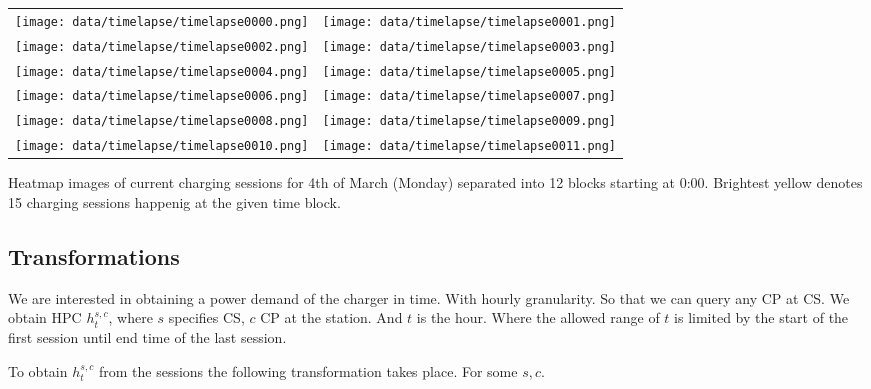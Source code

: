 \begin{marginfigure}
    \begin{tabular}{cc}
        \texttt{[image: data/timelapse/timelapse0000.png]} &
        \texttt{[image: data/timelapse/timelapse0001.png]}   \\
        \texttt{[image: data/timelapse/timelapse0002.png]} &
        \texttt{[image: data/timelapse/timelapse0003.png]}   \\
        \texttt{[image: data/timelapse/timelapse0004.png]} &
        \texttt{[image: data/timelapse/timelapse0005.png]}   \\
        \texttt{[image: data/timelapse/timelapse0006.png]} &
        \texttt{[image: data/timelapse/timelapse0007.png]}   \\
        \texttt{[image: data/timelapse/timelapse0008.png]} &
        \texttt{[image: data/timelapse/timelapse0009.png]}   \\
        \texttt{[image: data/timelapse/timelapse0010.png]} &
        \texttt{[image: data/timelapse/timelapse0011.png]}   \\
    \end{tabular}
    \caption{Heatmap images of current charging sessions for 4th of March (Monday) separated into 12 blocks starting at 0:00. Brightest yellow denotes 15 charging sessions happenig at the given time block.}
    \label{fig:timelapse-grid-full}
\end{marginfigure}




\subsection{Transformations}

We are interested in obtaining a power demand of the charger in time. With hourly granularity. So that we can query any \acrlong{CP} at \acrlong{CS}.
We obtain \acrlong{HPC} $h^{s,c}_t$, where $s$ specifies \acrlong{CS}, $c$ \acrlong{CP} at the station. And $t$ is the hour. Where the allowed range of $t$ is limited by the start of the first session until end time of the last session.

To obtain $h^{s,c}_t$ from the sessions the following transformation takes place. For some $s,c$.

